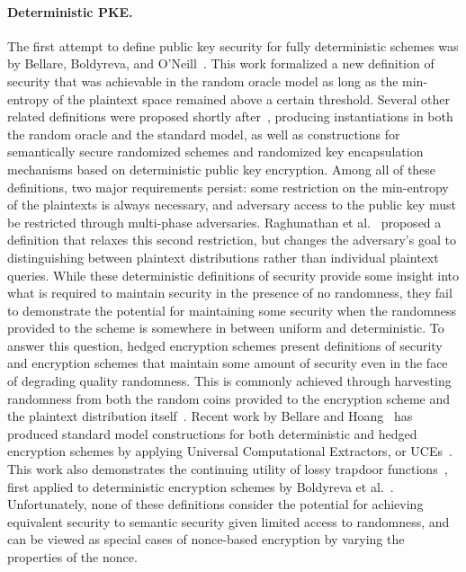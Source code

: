 \paragraph{Deterministic PKE. }
The first attempt to define public key security for fully deterministic schemes was by Bellare, Boldyreva, and O'Neill~\cite{BBO07}.
This work formalized a new definition of security that was achievable in the random oracle model as long as the min-entropy
of the plaintext space remained above a certain threshold.  Several other related definitions were proposed shortly after~\cite{BFOR08,BSO08},
producing instantiations in both the random oracle and the standard model, as well as constructions for semantically secure randomized schemes
and randomized key encapsulation mechanisms based on deterministic public key encryption.
Among all of these definitions, two major requirements persist: some restriction on the min-entropy of the plaintexts is always necessary, and
adversary access to the public key must be restricted through multi-phase adversaries. Raghunathan et al.~\cite{RSV13} proposed
a definition that relaxes this second restriction, but changes the adversary's goal to distinguishing between plaintext distributions
rather than individual plaintext queries.  While these deterministic definitions of security provide some insight into what is
required to maintain security in the presence of no randomness, they fail to demonstrate the potential for maintaining some
security when the randomness provided to the scheme is somewhere in between uniform and deterministic.  To answer
this question, hedged encryption schemes present definitions of security and encryption schemes that maintain some
amount of security even in the face of degrading quality randomness.  This is commonly achieved through harvesting randomness
from both the random coins provided to the encryption scheme and the plaintext distribution itself~\cite{BBNRTSSHY2009}.  
Recent work by Bellare and Hoang~\cite{BH15}
has produced standard model constructions for both deterministic and hedged encryption schemes by applying Universal Computational Extractors,
or UCEs~\cite{BHK13}.  This work also demonstrates the continuing utility of lossy trapdoor functions~\cite{PW11}, first applied to deterministic encryption
schemes by Boldyreva et al.~\cite{BSO08}.  Unfortunately, none of these definitions consider the potential for achieving equivalent security to 
semantic security given limited access to randomness, and can be viewed as special cases of nonce-based encryption by varying the
properties of the nonce.

